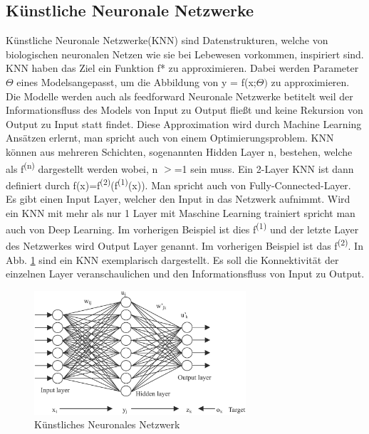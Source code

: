\documentclass{llncs}
\begin{document}
\subsection{Künstliche Neuronale Netzwerke}

Künstliche Neuronale Netzwerke(KNN) sind Datenstrukturen, welche von biologischen neuronalen Netzen wie sie bei Lebewesen vorkommen, inspiriert sind. KNN haben das Ziel ein Funktion f* zu approximieren. Dabei werden Parameter $\Theta$ eines Modelsangepasst, um die Abbildung von y = f(x;$\Theta)$ zu approximieren. Die Modelle werden auch als feedforward Neuronale Netzwerke betitelt weil der Informationsfluss des Models von Input zu Output fließt und keine Rekursion von Output zu Input statt findet. Diese Approximation wird durch Machine Learning Ansätzen erlernt, man spricht auch von einem Optimierungsproblem. KNN können aus mehreren Schichten, sogenannten Hidden Layer n, bestehen, welche als f\textsuperscript{(n)} dargestellt werden wobei, n $>$=1 sein muss. Ein 2-Layer KNN ist dann definiert durch f(x)=f\textsuperscript{(2)}(f\textsuperscript{(1)}(x)). Man spricht auch von Fully-Connected-Layer. Es gibt einen Input Layer, welcher den Input in das Netzwerk aufnimmt\cite{Grundlagen}. Wird ein KNN mit mehr als nur 1 Layer mit Maschine Learning trainiert spricht man auch von Deep Learning. Im vorherigen Beispiel ist dies f\textsuperscript{(1)} und der letzte Layer des Netzwerkes wird Output Layer genannt. Im vorherigen Beispiel ist das f\textsuperscript{(2)}. In Abb. \ref{fig:Bild1} sind ein KNN exemplarisch dargestellt. Es soll die Konnektivität der einzelnen Layer veranschaulichen und den Informationsfluss von Input zu Output.
\newpage
\begin{figure}[htbp]
	\centering
	\includegraphics[width=0.7\textwidth]{neuronalesnetzwerk.png}
	\caption{Künstliches Neuronales Netzwerk\protect\cite{annpic}}
	\label{fig:Bild1}
\end{figure}
\end{document}

